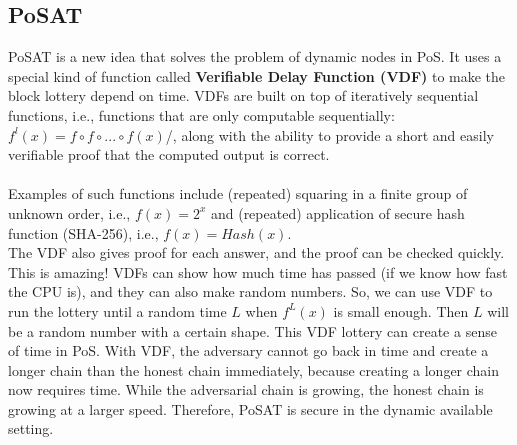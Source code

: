 \subsection{PoSAT}
PoSAT is a new idea that solves the problem of dynamic nodes in PoS. It uses a special kind of function called \textbf{Verifiable Delay Function (VDF)} to make the block lottery depend on time. VDFs are built on top of iteratively sequential functions, i.e., functions that are only computable sequentially: $f^l(x) = f \circ f \circ ... \circ f(x)$/, along with the ability to provide a short
and easily verifiable proof that the computed output is correct.\\\\
Examples of such functions include (repeated) squaring in a finite group of unknown order, i.e., $f(x) = 2^x$ and (repeated) application of secure hash function (SHA-256), i.e., $f(x) = Hash(x)$.\\
The VDF also gives proof for each answer, and the proof can be checked quickly. This is amazing! VDFs can show how much time has passed (if we know how fast the CPU is), and they can also make random numbers. So, we can use VDF to run the lottery until a random time $L$ when $f^L(x)$ is small enough. Then $L$ will be a random number with a certain shape. This VDF lottery can create a sense of time in PoS.
With VDF, the adversary cannot go back in time and create a longer chain than the honest
chain immediately, because creating a longer chain now requires time. While the adversarial chain is
growing, the honest chain is growing at a larger speed. Therefore, PoSAT is secure in the dynamic
available setting.
